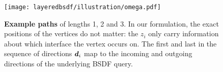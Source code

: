 \begin{figure}[h]
	\centering
	\texttt{[image: layeredbsdf/illustration/omega.pdf]}
	\caption[Example paths]{\label{fig:layeredbsdf:paths}
		\textbf{Example paths} of lengths 1, 2 and 3.
		In our formulation, the exact positions of the vertices do not matter: the $z_i$ only carry information about which interface the vertex occurs on.
		The first and last in the sequence of directions $\bm{d}_i$ map to the incoming and outgoing directions of the underlying BSDF query.
	}
\end{figure}
